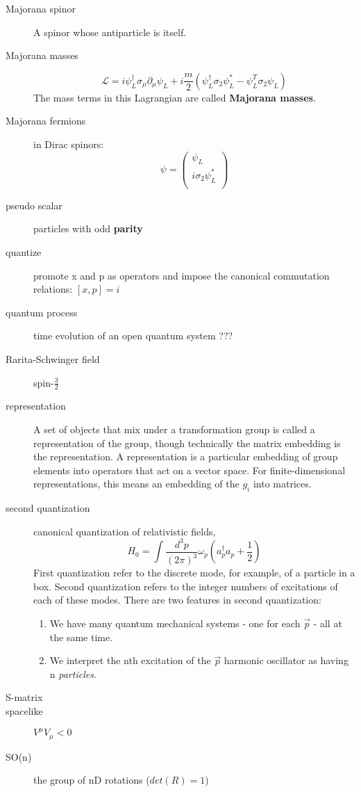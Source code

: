 \begin{description}
    \item [Majorana spinor] A spinor whose antiparticle is itself. 
    \item [Majorana masses]
	\[
	    \mathcal{L}=i\psi^\dag_L\sigma_\mu\partial_\mu\psi_L+i\frac{m}{2}(\psi^\dag_L\sigma_2\psi^*_L-\psi^T_L\sigma_2\psi_L)
	\]
	The mass terms in this Lagrangian are called \textbf{Majorana masses}.
    \item [Majorana fermions]
	in Dirac spinors:
	\[
	    \psi=\begin{pmatrix}
		\psi_L	\\
		i\sigma_2\psi^*_L   \\
	    \end{pmatrix}
	\]

    \item [pseudo scalar] particles with odd \textbf{parity}

    \item [quantize]	promote x and p as operators and impose the
	canonical commutation relations:    $[x, p] = i$
    \item [quantum process]  time evolution of an open quantum system ???

    \item [Rarita-Schwinger field]  spin-$\frac{3}{2}$
    \item [representation] A set of objects that mix under a transformation
	group is called a representation of the group, though technically
	the matrix embedding is the representation. A representation is a 
	particular embedding of group elements into operators that act on a 
	vector space. For finite-dimensional representations, this means an 
	embedding of the $g_i$ into matrices. 

    \item [second quantization]	canonical quantization of relativistic
	fields, 
	\[  H_0 = \int \frac{d^{3}p}{(2\pi)^3}\omega_p(a^{\dag}_p a_p +
	\frac{1}{2}) \] 
	First quantization refer to the discrete mode, for
	example, of a particle in a box. Second quantization refers to the
	integer numbers of excitations of each of these modes. There are two
	features in second quantization:
	\begin{enumerate}
	    \item We have many quantum mechanical systems - one for each
		$\vec{p}$ - all at the same time.
	    \item We interpret the nth excitation of the $\vec{p}$ harmonic
		oscillator as having n \emph{particles}.
	\end{enumerate}
    \item [S-matrix]
    \item [spacelike]	$V^\mu V_\mu < 0$
    \item [SO(n)] the group of nD rotations ($det(R) = 1$)
	

\end{description}
